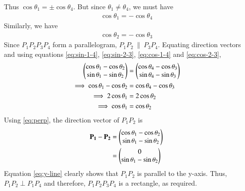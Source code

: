 \documentclass[journal,12pt,twocolumn]{IEEEtran}
\renewcommand{\vec}[1]{\boldsymbol{\mathbf{#1}}}
\begin{document}
\begin{enumerate}
    Thus $\cos\theta_1 = \pm\cos\theta_4$. But since $\theta_1 \neq \theta_4$,
    we must have 
    \begin{align}
        \cos\theta_1 = -\cos\theta_4
        \label{eq:cos-1-4}
    \end{align}
    Similarly, we have
    \begin{align}
        \cos\theta_2 = -\cos\theta_3
        \label{eq:cos-2-3}
    \end{align}
    Since $P_1P_2P_3P_4$ form a parallelogram, $P_1P_2\ \|\ P_3P_4$. Equating
    direction vectors and using equations \eqref{eq:sin-1-4}, \eqref{eq:sin-2-3},
    \eqref{eq:cos-1-4} and \eqref{eq:cos-2-3},
    \begin{align}
        \begin{pmatrix}\cos\theta_1-\cos\theta_2\\\sin\theta_1-\sin\theta_2\end{pmatrix} &= 
        \begin{pmatrix}\cos\theta_4-\cos\theta_3\\\sin\theta_4-\sin\theta_3\end{pmatrix} \\
        \implies \cos\theta_1-\cos\theta_2 &= \cos\theta_4-\cos\theta_3 \\
        \implies 2\cos\theta_1&=2\cos\theta_2 \\
        \implies \cos\theta_1&=\cos\theta_2
        \label{eq:perp}
    \end{align}
    Using \eqref{eq:perp}, the direction vector of $P_1P_2$ is
    \begin{align}
        \vec{P_1} - \vec{P_2} &= \myvec{\cos\theta_1-\cos\theta_2\\\sin\theta_1-\sin\theta_2} \\
                              &= \myvec{0\\\sin\theta_1-\sin\theta_2}
                              \label{eq:y-line}
    \end{align}
    Equation \eqref{eq:y-line} clearly shows that $P_1P_2$ is parallel to the 
    y-axis. Thus, $P_1P_2 \perp P_1P_4$ and therefore, $P_1P_2P_3P_4$ is
    a rectangle, as required.


\end{enumerate}
\end{document}
